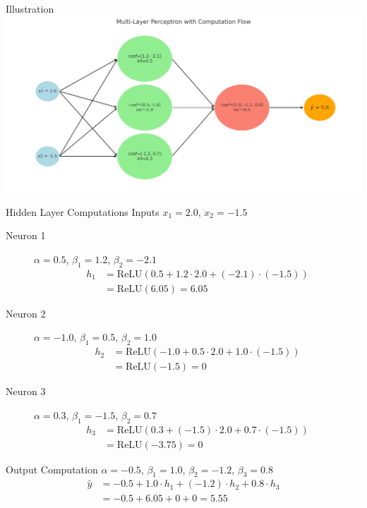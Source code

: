 \documentclass[10pt]{beamer}
\begin{document}
    \begin{frame}{Illustration}
 \includegraphics[width=1.15\textwidth]{../images/net2.png}

\end{frame}

\begin{frame}{Hidden Layer Computations}
    Inputs $x_1 = 2.0$, $x_2 = -1.5$
    
    \begin{description}
    \item[Neuron 1] $\alpha = 0.5$, $\beta_1 = 1.2$, $\beta_2 = -2.1$
    \begin{align*}
    h_1 &= \text{ReLU}(0.5 + 1.2 \cdot 2.0 + (-2.1) \cdot (-1.5)) \\
            &= \text{ReLU}(6.05) = 6.05
    \end{align*}
      
     \item[Neuron 2] $\alpha = -1.0$, $\beta_1 = 0.5$, $\beta_2 = 1.0$
    \begin{align*}
    h_2 &= \text{ReLU}(-1.0 + 0.5 \cdot 2.0 + 1.0 \cdot (-1.5)) \\
        &= \text{ReLU}(-1.5) = 0
    \end{align*}

    \item[Neuron 3] $\alpha = 0.3$, $\beta_1 = -1.5$, $\beta_2 = 0.7$
    \begin{align*}
    h_3 &= \text{ReLU}(0.3 + (-1.5) \cdot 2.0 + 0.7 \cdot (-1.5)) \\
        &= \text{ReLU}(-3.75) = 0
    \end{align*}
    \end{description}
    \end{frame}
    
    \begin{frame}{Output Computation}
         $\alpha = -0.5$, $\beta_1 = 1.0$, $\beta_2 = -1.2$, $\beta_3 = 0.8$
    \begin{align*}
    \hat{y} &= -0.5 + 1.0 \cdot h_1 + (-1.2) \cdot h_2 + 0.8 \cdot h_3 \\
            &= -0.5 + 6.05 + 0 + 0 = \boxed{5.55}
    \end{align*}
    \end{frame}
\end{document}
